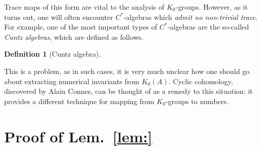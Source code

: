\documentclass[aps,pra,showpacs,notitlepage,onecolumn,superscriptaddress,nofootinbib]{revtex4-1}
\theoremstyle{definition}
\newtheorem{definition}{Definition}[section]
\begin{document}
\noindent Trace maps of this form are vital to the analysis of $K_0$-groups. However, as it turns out, one will often encounter $C^{*}$-algebras which \emph{admit no non-trivial trace}.
For example, one of the most important types of $C^{*}$-algebras are the so-called \emph{Cuntz algebras}, which are defined as follows.

\begin{definition}[Cuntz algebra]
  \end{definition}

\noindent This is a problem, as in such cases, it is very much unclear how one should go about extracting numerical invariants from $K_0(A)$. Cyclic cohomology, discovered by Alain Connes, can
be thought of as a remedy to this situation: it provides a different technique for mapping from $K_0$-groups to numbers.

\appendix

\section{Proof of Lem.~\ref{lem:}}
\end{document}
